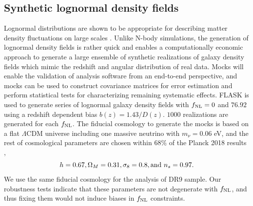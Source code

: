 \subsection{Synthetic lognormal density fields}\label{ssec:mocks}
Lognormal distributions are shown to be appropriate for describing matter density fluctuations on large scales \citep{coles1991}. Unlike N-body simulations, the generation of lognormal density fields is rather quick and enables a computationally economic approach to generate a large ensemble of synthetic realizations of galaxy density fields which mimic the redshift and angular distribution of real data. Mocks will enable the validation of analysis software from an end-to-end perspective, and mocks can be used to construct covariance matrices for error estimation and perform statistical tests for characterizing remaining systematic effects. \textsc{FLASK}  \citep[Full-sky Lognormal Astro-fields Simulation Kit;][]{Xavier_2016} is used to generate series of lognormal galaxy density fields with $f_{\rm NL}=0$ and $76.92$ using a redshift dependent bias $b(z)=1.43/D(z)$. $1000$ realizations are generated for each $f_{\rm NL}$. The fiducial cosmology to generate the mocks is based on a flat $\Lambda$CDM universe including one massive neutrino with $m_{\nu}=0.06$ eV, and the rest of cosmological parameters are chosen within $68\%$ of the Planck 2018 results \citep{aghanim2020planck},
\begin{equation*}
    h = 0.67,  \Omega_{M}=0.31, \sigma_{8}=0.8, {\rm and}~ n_{s}=0.97.
\end{equation*}
We use the same fiducial cosmology for the analysis of DR9 sample. Our robustness tests indicate that these parameters are not degenerate with $f_{\rm NL}$, and thus fixing them would not induce biases in $f_{\rm NL}$ constraints.